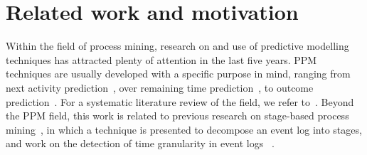 \section{Related work and motivation}\label{sec:2:motivation}
Within the field of process mining, research on and use of predictive modelling techniques has attracted plenty of attention in the last five years. PPM techniques are usually developed with a specific purpose in mind, ranging from next activity prediction~\cite{evermann2017predicting,DBLP:conf/caise/TaxVRD17}, over remaining time prediction~\cite{verenich2019survey}, to outcome prediction~\cite{kratsch2020machine}. For a systematic literature review of the field, we refer to~\cite{neu2021systematic}. 
Beyond the PPM field, this work is related to previous research on stage-based process mining~\cite{nguyen2016business}, in which a technique is presented to decompose an event log into stages, and work on the detection of time granularity in event logs ~\cite{pourbafrani2020}. 

